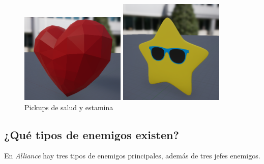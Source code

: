 \begin{itemize}
\begin{figure}[H]
  \begin{minipage}{0.5\textwidth}
    \centering
    \includegraphics[width=5cm]{./images/Health.png}
  \end{minipage}%
  \hspace{1mm}
  \begin{minipage}{0.5\textwidth}
    \centering
    \includegraphics[width=5cm]{./images/Stamina.png}
  \end{minipage}
  \caption{Pickups de salud y estamina}
  \label{Pickup}
\end{figure}
\end{itemize}

\subsection{¿Qué tipos de enemigos existen?}

En \textit{Alliance} hay tres tipos de enemigos principales, además de tres jefes enemigos.

